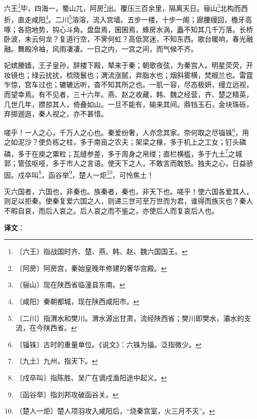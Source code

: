 \documentclass[12pt,UTF-8,openany]{ctexbook}
\begin{document}
\begin{normalsize}
    
    六王\footnote{〔六王〕指战国时齐、楚、燕、韩、赵、魏六国国王。}毕，四海一，蜀山兀，阿房\footnote{〔阿房〕阿房宫，秦始皇晚年修建的奢华宫殿。}出。覆压三百余里，隔离天日。骊山\footnote{〔骊山〕现在陕西省临潼县东南。}北构而西折，直走咸阳\footnote{〔咸阳〕秦朝都城，现在陕西咸阳市。}。二川\footnote{〔二川〕指渭水和樊川。渭水源出甘肃，流经陕西省；樊川即樊水，灞水的支流，在今陕西省。}溶溶，流入宫墙。五步一楼，十步一阁；廊腰缦回，檐牙高啄；各抱地势，钩心斗角。盘盘焉，囷囷焉，蜂房水涡，矗不知其几千万落。长桥卧波，未云何龙？复道行空，不霁何虹？高低冥迷，不知东西。歌台暖响，春光融融。舞殿冷袖，风雨凄凄。一日之内，一宫之间，而气候不齐。
    
    妃嫔媵嫱，王子皇孙，辞楼下殿，辇来于秦；朝歌夜弦，为秦宫人。明星荧荧，开妆镜也；绿云扰扰，梳晓鬟也；渭流涨腻，弃脂水也；烟斜雾横，焚椒兰也。雷霆乍惊，宫车过也；辘辘远听，杳不知其所之也。一肌一容，尽态极妍，缦立远视，而望幸焉。有不见者，三十六年。燕、赵之收藏，韩、魏之经营，齐、楚之精英，几世几年，摽掠其人，倚叠如山。一旦不能有，输来其间。鼎铛玉石，金块珠砾，弃掷逦迤，秦人视之，亦不甚惜。
    
    嗟乎！一人之心，千万人之心也。秦爱纷奢，人亦念其家。奈何取之尽锱铢\footnote{〔锱铢〕古时的重量单位。《说文》：六铢为锱。泛指微少。}，用之如泥沙？使负栋之柱，多于南亩之农夫；架梁之椽，多于机上之工女；钉头磷磷，多于在庾之粟粒；瓦缝参差，多于周身之帛缕；直栏横槛，多于九土\footnote{〔九土〕九州，指天下。}之城郭；管弦呕哑，多于市人之言语。使天下之人，不敢言而敢怒。独夫之心，日益骄固。戍卒叫\footnote{〔戍卒叫〕指陈胜、吴广在谪戍渔阳途中起义。}，函谷举\footnote{〔函谷举〕指刘邦攻破函谷关。}，楚人一炬\footnote{〔楚人一炬〕楚人项羽攻入咸阳后，“烧秦宫室，火三月不灭”。}，可怜焦土！
    
    灭六国者，六国也，非秦也。族秦者，秦也，非天下也。嗟乎！使六国各爱其人，则足以拒秦。使秦复爱六国之人，则递三世可至万世而为君，谁得而族灭也？秦人不暇自哀，而后人哀之。后人哀之而不鉴之，亦使后人而复哀后人也。
\end{normalsize}


\newpage

\textbf{译文}：

\vspace{1em}
\end{document}

